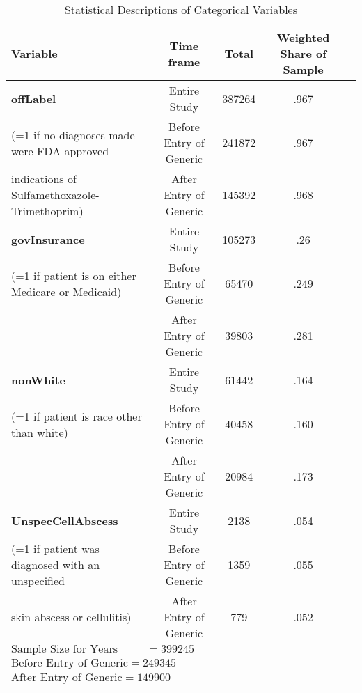 \begin{table}[htbp]\centering
\def\sym#1{\ifmmode^{#1}\else\(^{#1}\)\fi}
\caption{Statistical Descriptions of Categorical Variables\label{tab1}}
\begin{tabular}{l*{4}{c}}
\hline\hline
            Variable&\multicolumn{1}{c}{Time frame}&\multicolumn{1}{c}{Total}&\multicolumn{1}{c}{Weighted Share of Sample}\\
\hline
\textbf{offLabel}                                                &     Entire Study&             387264&      .967\\
(=1 if no diagnoses made were FDA approved          &     Before Entry of Generic&    241872&      .967\\
indications of Sulfamethoxazole-Trimethoprim)  &     After Entry of Generic&      145392&      .968\\
[1em]
\textbf{govInsurance}                                            &     Entire Study&             105273&      .26 \\
(=1 if patient is on either Medicare or Medicaid)       &     Before Entry of Generic&     65470 &      .249\\
                                                        &     After Entry of Generic&      39803 &      .281\\
[1em]
\textbf{nonWhite}                                                &     Entire Study&             61442&      .164\\
(=1 if patient is race other than white)                &     Before Entry of Generic&     40458&      .160\\
                                                        &     After Entry of Generic&      20984&      .173\\
[1em]
\textbf{UnspecCellAbscess}                                       &     Entire Study&             2138 &      .054\\
(=1 if patient was diagnosed with an unspecified        &     Before Entry of Generic&     1359 &      .055\\
skin abscess or cellulitis)                            &     After Entry of Generic&      779  &      .052\\
\hline
$\text{Sample Size for Years 2007-2016} = 399245$\\
$\text{Before Entry of Generic} = 249345$\\
$\text{After Entry of Generic} = 149900$\\
\hline\hline
\end{tabular}
\label{tab:Table4.3}
\end{table}

